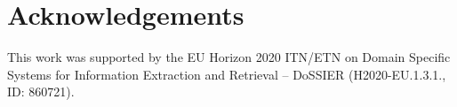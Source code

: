 \documentclass[11pt]{article}
\begin{document}
% 
% 







\section*{Acknowledgements}

This work was supported by the EU Horizon 2020 ITN/ETN on Domain Specific Systems for Information Extraction and Retrieval -- DoSSIER (H2020-EU.1.3.1., ID: 860721).







\end{document}
